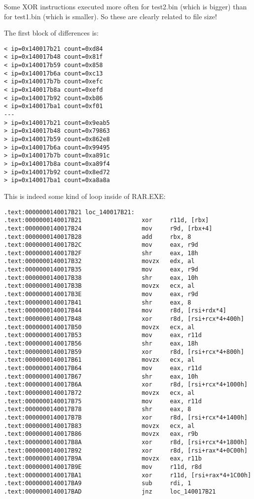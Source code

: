 Some XOR instructions executed more often for test2.bin (which is bigger) than for test1.bin (which is smaller).
So these are clearly related to file size!

The first block of differences is:

\begin{lstlisting}
< ip=0x140017b21 count=0xd84
< ip=0x140017b48 count=0x81f
< ip=0x140017b59 count=0x858
< ip=0x140017b6a count=0xc13
< ip=0x140017b7b count=0xefc
< ip=0x140017b8a count=0xefd
< ip=0x140017b92 count=0xb86
< ip=0x140017ba1 count=0xf01
---
> ip=0x140017b21 count=0x9eab5
> ip=0x140017b48 count=0x79863
> ip=0x140017b59 count=0x862e8
> ip=0x140017b6a count=0x99495
> ip=0x140017b7b count=0xa891c
> ip=0x140017b8a count=0xa89f4
> ip=0x140017b92 count=0x8ed72
> ip=0x140017ba1 count=0xa8a8a
\end{lstlisting}

This is indeed some kind of loop inside of RAR.EXE:

\begin{lstlisting}
.text:0000000140017B21 loc_140017B21:
.text:0000000140017B21                 xor     r11d, [rbx]
.text:0000000140017B24                 mov     r9d, [rbx+4]
.text:0000000140017B28                 add     rbx, 8
.text:0000000140017B2C                 mov     eax, r9d
.text:0000000140017B2F                 shr     eax, 18h
.text:0000000140017B32                 movzx   edx, al
.text:0000000140017B35                 mov     eax, r9d
.text:0000000140017B38                 shr     eax, 10h
.text:0000000140017B3B                 movzx   ecx, al
.text:0000000140017B3E                 mov     eax, r9d
.text:0000000140017B41                 shr     eax, 8
.text:0000000140017B44                 mov     r8d, [rsi+rdx*4]
.text:0000000140017B48                 xor     r8d, [rsi+rcx*4+400h]
.text:0000000140017B50                 movzx   ecx, al
.text:0000000140017B53                 mov     eax, r11d
.text:0000000140017B56                 shr     eax, 18h
.text:0000000140017B59                 xor     r8d, [rsi+rcx*4+800h]
.text:0000000140017B61                 movzx   ecx, al
.text:0000000140017B64                 mov     eax, r11d
.text:0000000140017B67                 shr     eax, 10h
.text:0000000140017B6A                 xor     r8d, [rsi+rcx*4+1000h]
.text:0000000140017B72                 movzx   ecx, al
.text:0000000140017B75                 mov     eax, r11d
.text:0000000140017B78                 shr     eax, 8
.text:0000000140017B7B                 xor     r8d, [rsi+rcx*4+1400h]
.text:0000000140017B83                 movzx   ecx, al
.text:0000000140017B86                 movzx   eax, r9b
.text:0000000140017B8A                 xor     r8d, [rsi+rcx*4+1800h]
.text:0000000140017B92                 xor     r8d, [rsi+rax*4+0C00h]
.text:0000000140017B9A                 movzx   eax, r11b
.text:0000000140017B9E                 mov     r11d, r8d
.text:0000000140017BA1                 xor     r11d, [rsi+rax*4+1C00h]
.text:0000000140017BA9                 sub     rdi, 1
.text:0000000140017BAD                 jnz     loc_140017B21
\end{lstlisting}

